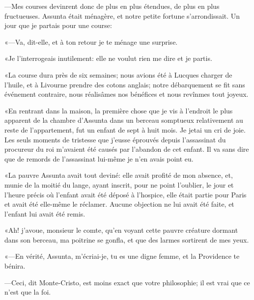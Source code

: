 —Mes courses devinrent donc de plus en plus étendues, de plus en plus fructueuses. Assunta était ménagère, et notre petite fortune s'arrondissait. Un jour que je partais pour une course: 

«—Va, dit-elle, et à ton retour je te ménage une surprise. 

«Je l'interrogeais inutilement: elle ne voulut rien me dire et je partis.  

«La course dura près de six semaines; nous avions été à Lucques charger de l'huile, et à Livourne prendre des cotons anglais; notre débarquement se fit sans événement contraire, nous réalisâmes nos bénéfices et nous revînmes tout joyeux. 

«En rentrant dans la maison, la première chose que je vis à l'endroit le plus apparent de la chambre d'Assunta dans un berceau somptueux relativement au reste de l'appartement, fut un enfant de sept à huit mois. Je jetai un cri de joie. Les seuls moments de tristesse que j'eusse éprouvés depuis l'assassinat du procureur du roi m'avaient été causés par l'abandon de cet enfant. Il va sans dire que de remords de l'assassinat lui-même je n'en avais point eu. 

«La pauvre Assunta avait tout deviné: elle avait profité de mon absence, et, munie de la moitié du lange, ayant inscrit, pour ne point l'oublier, le jour et l'heure précis où l'enfant avait été déposé à l'hospice, elle était partie pour Paris et avait été elle-même le réclamer. Aucune objection ne lui avait été faite, et l'enfant lui avait été remis. 

«Ah! j'avoue, monsieur le comte, qu'en voyant cette pauvre créature dormant dans son berceau, ma poitrine se gonfla, et que des larmes sortirent de mes yeux. 

«—En vérité, Assunta, m'écriai-je, tu es une digne femme, et la Providence te bénira. 

—Ceci, dit Monte-Cristo, est moins exact que votre philosophie; il est vrai que ce n'est que la foi. 

